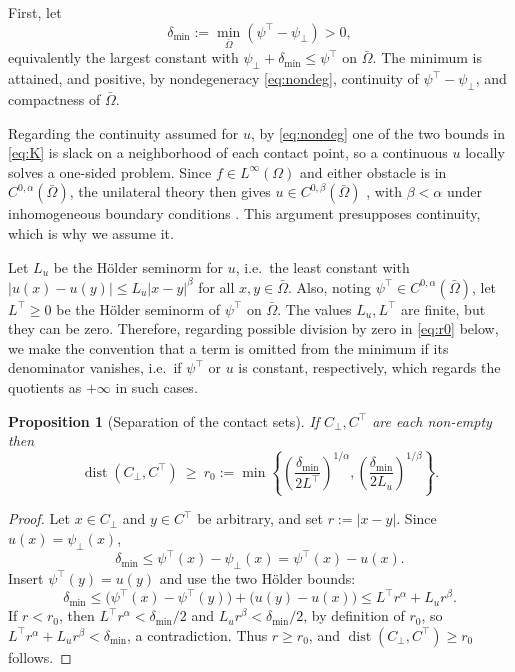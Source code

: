 \documentclass[12pt]{amsart}
\numberwithin{equation}{section}
\theoremstyle{plain}
\newtheorem{proposition}[theorem]{Proposition}
\theoremstyle{definition}
\theoremstyle{remark}
\newcommand{\Om}{\Omega}
\newcommand{\psilo}{\psi_\bot}
\newcommand{\psiup}{\psi^\top}
\newcommand{\Cbot}{C_\bot}
\newcommand{\Ctop}{C^\top}
\begin{document}
First, let
\begin{equation}
\label{eq:deltamin}
  \delta_{\min} := \min_{\bar\Om} (\psiup - \psilo) > 0,
\end{equation}
equivalently the largest constant with $\psilo + \delta_{\min} \le \psiup$ on $\bar\Om$.  The minimum is attained, and positive, by nondegeneracy \eqref{eq:nondeg}, continuity of $\psiup - \psilo$, and compactness of $\bar\Om$.

Regarding the continuity assumed for $u$, by \eqref{eq:nondeg} one of the two bounds in \eqref{eq:K} is slack on a neighborhood of each contact point, so a continuous $u$ locally solves a one-sided problem.  Since $f \in L^\infty(\Om)$ and either obstacle is in $C^{0,\alpha}(\bar\Om)$, the unilateral theory then gives $u \in C^{0,\beta}(\bar\Om)$ \cite[Theorem 2.1]{FinziVita1982}, with $\beta < \alpha$ under inhomogeneous boundary conditions \cite{Biroli1979}.  This argument presupposes continuity, which is why we assume it.

Let $L_u$ be the H\"older seminorm for $u$, i.e.\ the least constant with $|u(x) - u(y)| \le L_u |x-y|^\beta$ for all $x,y \in \bar\Om$.  Also, noting $\psiup \in C^{0,\alpha}(\bar\Om)$, let $L^\top \ge 0$ be the H\"older seminorm of $\psiup$ on $\bar\Om$.  The values $L_u,L^\top$ are finite, but they can be zero.  Therefore, regarding possible division by zero in \eqref{eq:r0} below, we make the convention that a term is omitted from the minimum if its denominator vanishes, i.e.\ if $\psiup$ or $u$ is constant, respectively, which regards the quotients as $+\infty$ in such cases.

\begin{proposition}[Separation of the contact sets]
\label{prop:separation}
If $\Cbot, \Ctop$ are each non-empty
then
\begin{equation}
\label{eq:r0}
  \operatorname{dist}(\Cbot, \Ctop) \ \ge\ r_0
  := \min\left\{ \left(\frac{\delta_{\min}}{2 L^\top}\right)^{1/\alpha},
                 \left(\frac{\delta_{\min}}{2 L_u}\right)^{1/\beta} \right\}.
\end{equation}
\end{proposition}

\begin{proof}
Let $x \in \Cbot$ and $y \in \Ctop$ be arbitrary, and set $r := |x-y|$.  Since $u(x) = \psilo(x)$,
\begin{equation}
  \delta_{\min} \le \psiup(x) - \psilo(x) = \psiup(x) - u(x).
\end{equation}
Insert $\psiup(y) = u(y)$ and use the two H\"older bounds:
\begin{equation}
  \delta_{\min} \le \bigl(\psiup(x) - \psiup(y)\bigr) + \bigl(u(y) - u(x)\bigr)
  \le L^\top r^\alpha + L_u r^\beta.
\end{equation}
If $r < r_0$, then
$L^\top r^\alpha < \delta_{\min}/2$ and $L_u r^\beta < \delta_{\min}/2$, by definition of $r_0$,  so $L^\top r^\alpha + L_u r^\beta < \delta_{\min}$, a contradiction. Thus
$r \ge r_0$, and $\operatorname{dist}(\Cbot,\Ctop) \ge r_0$ follows.
\end{proof}
\end{document}
